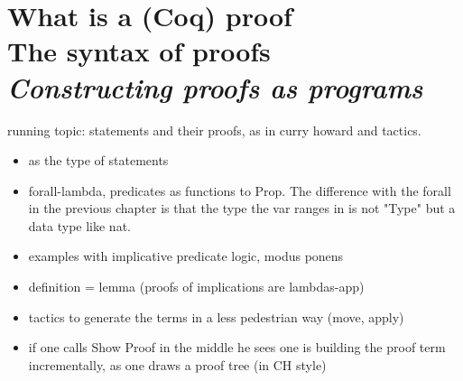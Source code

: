 \chapter{What is a (Coq) proof\\The syntax of proofs\\[2ex]\Large\itshape Constructing proofs as programs}

%
%
%

running topic: statements and their proofs, as in curry howard and
tactics.

\begin{itemize}
\item {} as the type of statements
\item forall-lambda, predicates as functions to Prop.  The difference with the forall in the previous chapter is that the type the var ranges in is not "Type" but a data type like nat.
\item examples with implicative predicate logic, modus ponens
\item definition = lemma (proofs of implications are lambdas-app)
\item tactics to generate the terms in a less pedestrian way (move, apply)
\item if one calls Show Proof in the middle he sees one is building
	the proof term incrementally, as one draws a proof tree (in CH style)
\end{itemize}

